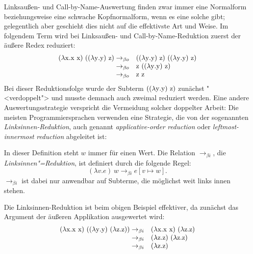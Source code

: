 Linksaußen- und Call-by-Name-Auswertung finden zwar immer eine
Normalform beziehungsweise eine schwache Kopfnormalform, wenn es eine solche
gibt; gelegentlich aber geschieht dies nicht auf die effektivste Art
und Weise.  Im folgendem Term wird bei Linksaußen- und
Call-by-Name-Reduktion zuerst der äußere Redex reduziert:
%
\begin{displaymath}
  \begin{array}{rl}
  (\lambda \mathrm x.\mathrm x~\mathrm x)~((\lambda \mathrm y.\mathrm y)~\mathrm z)
  \rightarrow_{\beta o} & 
  ((\lambda \mathrm y.\mathrm y)~\mathrm z)~((\lambda \mathrm y.\mathrm y)~\mathrm z)
  \\
  \rightarrow_{\beta o} & 
  \mathrm z~((\lambda \mathrm y.\mathrm y)~\mathrm z)
  \\
  \rightarrow_{\beta o} & 
  \mathrm z~\mathrm z
\end{array}
\end{displaymath}
%
Bei dieser Reduktionsfolge wurde der Subterm $((\lambda \mathrm y.\mathrm y)~\mathrm z)$
zunächst "<verdoppelt"> und musste demnach auch zweimal reduziert
werden.  Eine andere Auswertungsstrategie verspricht die Vermeidung
solcher doppelter Arbeit:  Die meisten Programmiersprachen verwenden
eine Strategie, die von der sogenannten \textit{Linksinnen-Reduktion},
auch genannt \emph{applicative-order reduction} oder
\emph{leftmost-innermost reduction} abgeleitet ist:
%
\begin{definition}
  In dieser Definition steht $w$ immer für einen Wert.
  Die Relation $\rightarrow_{\beta i}$, die
  \textit{Linksinnen"=Reduktion}, ist definiert durch die
  folgende Regel:
  \begin{displaymath}
    (\lambda v.e)~w \rightarrow_{\beta i} e[v \mapsto w].
  \end{displaymath}
  $\rightarrow_{\beta i}$ ist dabei nur anwendbar auf Subterme, die
  möglichst weit links innen stehen.
\end{definition}
%
Die Linksinnen-Reduktion ist beim obigen Beispiel effektiver, da
zunächst das Argument der äußeren Applikation ausgewertet wird:
%
\begin{displaymath}
  \begin{array}{rl}
  (\lambda \mathrm x.\mathrm x~\mathrm x)~((\lambda \mathrm y.\mathrm y)~(\lambda \mathrm z.\mathrm z))
  \rightarrow_{\beta i} & 
  (\lambda \mathrm x.\mathrm x~\mathrm x)~(\lambda \mathrm z.\mathrm z)
  \\
  \rightarrow_{\beta i} & 
  (\lambda \mathrm z.\mathrm z)~(\lambda \mathrm z.\mathrm z)
  \\
  \rightarrow_{\beta i} & 
  (\lambda \mathrm z.\mathrm z)
\end{array}
\end{displaymath}
